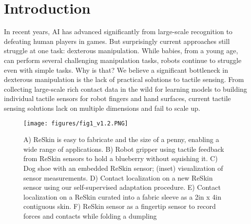 \documentclass{article}
\begin{document}
\section{Introduction} %
In recent years, AI has advanced significantly from large-scale recognition to defeating human players in games. But surprisingly current approaches still struggle at one task: dexterous manipulation. While babies, from a young age, can perform several challenging manipulation tasks, robots continue to struggle even with simple tasks. Why is that? We believe a significant bottleneck in dexterous manipulation is the lack of practical solutions to tactile sensing. From collecting large-scale rich contact data in the wild for learning models to building individual tactile sensors for robot fingers and hand surfaces, current tactile sensing solutions lack on multiple dimensions and fail to scale up.

\begin{figure}[!h]
    \centering
    \texttt{[image: figures/fig1\_v1.2.PNG]}
    \caption{A) ReSkin is easy to fabricate and the size of a penny, enabling a wide range of applications. B) Robot gripper using tactile feedback from ReSkin sensors to hold a blueberry without squishing it. C) Dog shoe with an embedded ReSkin sensor; (inset) visualization of sensor measurements. D) Contact localization on a new ReSkin sensor using our self-supervised adaptation procedure. E) Contact localization on a ReSkin curated into a fabric sleeve as a 2in x 4in contiguous skin. F) ReSkin sensor as a fingertip sensor to record forces and contacts while folding a dumpling}
    \label{fig:overview}
    \vspace{-0.15in}
\end{figure}
\end{document}

